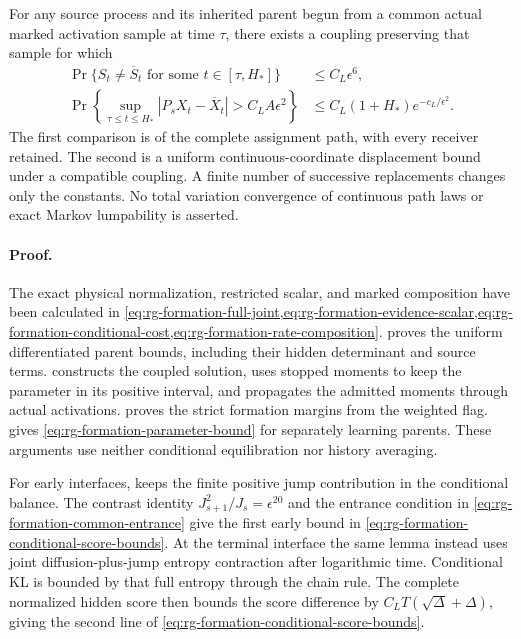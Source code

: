 For any source process and its inherited parent begun from a common
actual marked activation sample at time \(\tau\), there exists a
coupling preserving that sample for which
\begin{equation}
\begin{aligned}
\Pr\{S_t\ne\overline S_t
       \text{ for some }t\in[\tau,H_*]\}
 &\le C_L\epsilon^6,\\
\Pr\left\{\sup_{\tau\le t\le H_*}
       |P_sX_t-\overline X_t|>C_LA\epsilon^2\right\}
 &\le C_L(1+H_*)e^{-c_L/\epsilon^2}.
\end{aligned}
\label{eq:rg-formation-two-path-bounds}
\end{equation}
The first comparison is of the complete assignment path, with every
receiver retained. The second is a uniform continuous-coordinate
displacement bound under a compatible coupling. A finite number of
successive replacements changes only the constants. No total variation
convergence of continuous path laws or exact Markov lumpability is
asserted. 

\paragraph{Proof.}
The exact physical normalization, restricted scalar, and marked
composition have been calculated in
\cref{eq:rg-formation-full-joint,eq:rg-formation-evidence-scalar,eq:rg-formation-conditional-cost,eq:rg-formation-rate-composition}.
 proves the uniform differentiated
parent bounds, including their hidden determinant and source terms.
 constructs the coupled
solution, uses stopped moments to keep the parameter in its positive
interval, and propagates the admitted moments through actual
activations.  proves the strict
formation margins from the weighted flag.
 gives
\cref{eq:rg-formation-parameter-bound} for separately learning
parents. These arguments use neither conditional equilibration nor
history averaging.

For early interfaces, 
keeps the finite positive jump contribution in the conditional balance.
The contrast identity \(J_{s+1}^2/J_s=\epsilon^{20}\) and the
entrance condition in \cref{eq:rg-formation-common-entrance} give
the first early bound in
\cref{eq:rg-formation-conditional-score-bounds}. At the terminal
interface the same lemma instead uses joint diffusion-plus-jump
entropy contraction after logarithmic time. Conditional KL is bounded
by that full entropy through the chain rule. The complete normalized
hidden score then bounds the score difference by
\(C_LT(\sqrt\Delta+\Delta)\), giving the second line of
\cref{eq:rg-formation-conditional-score-bounds}.

